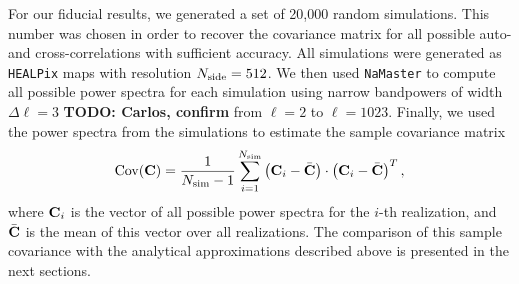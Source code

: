 \documentclass[a4paper,11pt]{article}
\newcommand{\todo}[1]{{\bf TODO: #1}}
\begin{document}
      For our fiducial results, we generated a set of 20,000 random simulations. This number was chosen in order to recover the covariance matrix for all possible auto- and cross-correlations with sufficient accuracy. All simulations were generated as {\tt HEALPix} maps with resolution $N_{\rm side}=512$. We then used {\tt NaMaster} to compute all possible power spectra for each simulation using narrow bandpowers of width $\Delta\ell=3$ \todo{Carlos, confirm} from $\ell=2$ to $\ell=1023$. Finally, we used the power spectra from the simulations to estimate the sample covariance matrix
      \begin{equation}
        {\rm Cov}({\bf C}) =\frac{1}{N_{\rm sim}-1}\sum_{i=1}^{N_{\rm sim}}\left({\bf C}_i-\bar{\bf C}\right)\cdot\left({\bf C}_i-\bar{\bf C}\right)^T,
      \end{equation}
      where ${\bf C}_i$ is the vector of all possible power spectra for the $i$-th realization, and $\bar{\bf C}$ is the mean of this vector over all realizations. The comparison of this sample covariance with the analytical approximations described above is presented in the next sections.
\end{document}
